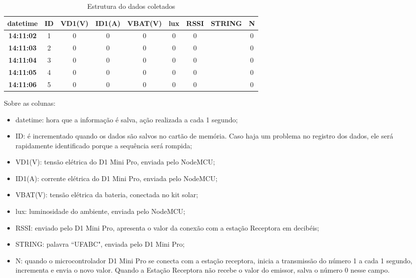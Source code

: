 \documentclass[11pt,a4paper]{article}
\begin{document}
\begin{table}[!ht]\footnotesize


\caption{Estrutura do dados coletados}
\label{tab:dados}

\begin{tabular}{ccccccccc}
\hline
\textbf{datetime} & \textbf{ID} & \textbf{VD1(V)} & \textbf{ID1(A)} & \textbf{VBAT(V)} & \textbf{lux} & \textbf{RSSI} & \textbf{STRING} & \textbf{N} \\ \hline
\textbf{14:11:02} & 1           & 0               & 0               & 0                & 0            & 0             &                 & 0          \\ \hline
\textbf{14:11:03} & 2           & 0               & 0               & 0                & 0            & 0             &                 & 0          \\ \hline
\textbf{14:11:04} & 3           & 0               & 0               & 0                & 0            & 0             &                 & 0          \\ \hline
\textbf{14:11:05} & 4           & 0               & 0               & 0                & 0            & 0             &                 & 0          \\ \hline
\textbf{14:11:06} & 5           & 0               & 0               & 0                & 0            & 0             &                 & 0          \\ \hline
\end{tabular}
\end{table}


Sobre as colunas:
\begin{itemize}
  \item datetime: hora que a informação é salva, ação realizada a cada 1 segundo; 
  \item ID: é incrementado quando os dados são salvos no cartão de memória. Caso haja um problema no registro dos dados, ele será rapidamente identificado porque a sequência será rompida;
  \item VD1(V): tensão elétrica do D1 Mini Pro, enviada pelo NodeMCU;
  \item ID1(A): corrente elétrica do D1 Mini Pro, enviada pelo NodeMCU;
  \item VBAT(V): tensão elétrica da bateria, conectada no kit solar;
  \item lux: luminosidade do ambiente, enviada pelo NodeMCU;
  \item RSSI: enviado pelo D1 Mini Pro, apresenta o valor da conexão com a estação Receptora em decibéis;
  \item STRING: palavra ``UFABC", enviada pelo D1 Mini Pro;
  \item N: quando o microcontrolador D1 Mini Pro se conecta com a estação receptora, inicia a transmissão do número 1 a cada 1 segundo, incrementa e envia o novo valor. Quando a Estação Receptora não recebe o valor do emissor, salva o número 0 nesse campo.
\end{itemize}
\end{document}
